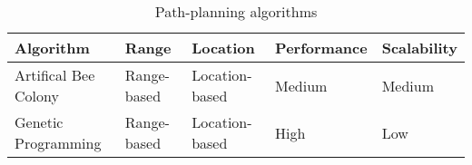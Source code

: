   \begin{table}[H]
  \renewcommand{\arraystretch}{1.3}
  \caption{Path-planning algorithms}
  \label{table_alg_path_planning}
  \centering
  \begin{tabular}{|p{3cm}|l|l|l|l|}
    \hline
    \bfseries Algorithm & \bfseries Range &\bfseries Location &  \bfseries Performance & \bfseries Scalability\\
    \hline
     Artifical Bee Colony & Range-based & Location-based & Medium & Medium\\\hline
     Genetic Programming & Range-based & Location-based & High & Low\\\hline
    \end{tabular}
  \end{table}

  

